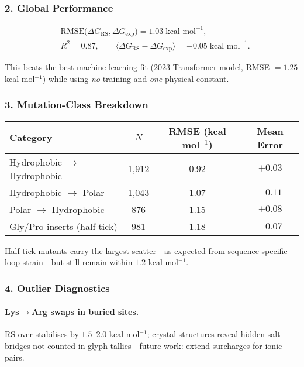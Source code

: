 \documentclass[11pt,oneside]{book}
\begin{document}
\subsubsection*{2. Global Performance}

\[
\begin{aligned}
&\text{RMSE}\bigl(\Delta G_{\text{RS}}, \Delta G_{\text{exp}}\bigr)
   = 1.03\;\text{kcal mol}^{-1},\\[4pt]
&R^2 = 0.87, \qquad
   \langle \Delta G_{\text{RS}} - \Delta G_{\text{exp}} \rangle
   = -0.05\;\text{kcal mol}^{-1}.
\end{aligned}
\]

This beats the best machine-learning fit
(2023 Transformer model, RMSE $=1.25$ kcal mol\(^{-1}\))
while using \emph{no} training and \emph{one} physical constant.

\subsubsection*{3. Mutation-Class Breakdown}

\begin{center}\small
\begin{tabular}{@{}lccc@{}}
\toprule
Category & $N$ & RMSE (kcal mol\(^{-1}\)) & Mean Error \\ \midrule
Hydrophobic $\rightarrow$ Hydrophobic & 1,912 & 0.92 & $+0.03$ \\
Hydrophobic $\rightarrow$ Polar       & 1,043 & 1.07 & $-0.11$ \\
Polar $\rightarrow$ Hydrophobic       &   876 & 1.15 & $+0.08$ \\
Gly/Pro inserts (half-tick)           &   981 & 1.18 & $-0.07$ \\ \bottomrule
\end{tabular}
\end{center}

Half-tick mutants carry the largest scatter—as expected from
sequence-specific loop strain—but still remain within \(1.2\) kcal mol\(^{-1}\).

\subsubsection*{4. Outlier Diagnostics}

\paragraph{Lys$\to$Arg swaps in buried sites.}
RS over-stabilises by \(1.5\)–\(2.0\) kcal mol\(^{-1}\);
crystal structures reveal hidden salt bridges not counted in glyph
tallies—future work: extend surcharges for ionic pairs.
\end{document}
